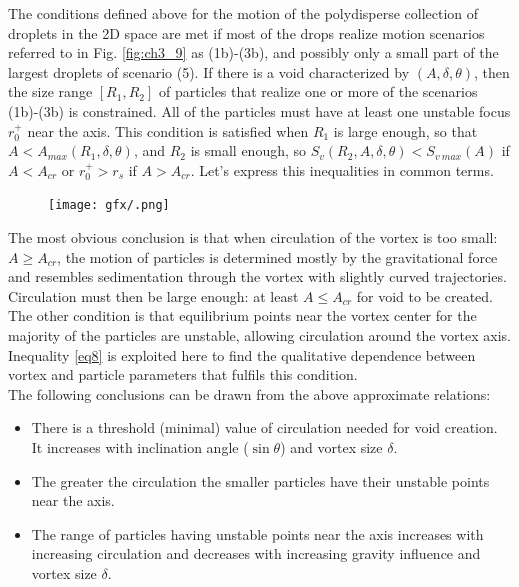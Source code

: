 \documentclass[../main.tex]{subfiles}
\begin{document}
The conditions defined above for the motion of the polydisperse collection of droplets in the 2D space are met if most of the drops realize motion scenarios referred to in Fig. \autoref{fig:ch3_9} as (1b)-(3b), and possibly only a small part of the largest droplets of scenario (5). If there is a void characterized by $(A,\delta,\theta)$, then the size range $[R_1,R_2]$ of particles that realize one or more of the scenarios (1b)-(3b) is constrained. All of the particles must have at least one unstable focus $r^+_0$ near the axis. This condition is  satisfied when $R_1$ is large enough, so that $A<A_{max}(R_1,\delta,\theta)$, and $R_2$ is small enough, so $S_v(R_2,A, \delta,\theta)<S_{v\ max}(A)$ if $A<A_{cr}$ or $r^+_0>r_s$ if $A>A_{cr}$. Let's express this inequalities in common terms.

\begin{figure}[h]
\centering
\noindent\texttt{[image: gfx/.png]}
\caption{}
\label{fig:ch_54}
\end{figure}


The most obvious conclusion is that when circulation of the vortex is too small: $A \geq A_{cr}$,  the motion of particles is determined mostly by the gravitational force and resembles sedimentation through the vortex with slightly curved trajectories. Circulation must then be large enough: at least $A \leq A_{cr}$ for void to be created.\\
The other condition is that equilibrium points near the vortex center for the majority of the particles are unstable, allowing circulation around the vortex axis. Inequality \ref{eq8} is exploited here to find the qualitative dependence between vortex and particle parameters that fulfils this condition.\\
\noindent The following conclusions can be drawn from the above approximate relations:

\begin{itemize}
\item There is a threshold (minimal) value of circulation needed for void creation. It increases with inclination angle ($\sin \theta$) and vortex size $\delta$.
\item The greater the circulation the smaller particles  have their unstable points near the axis.
\item The range of particles having unstable points near the axis increases with increasing circulation and decreases with increasing gravity influence and vortex size $\delta$.
\end{itemize}
\end{document}
